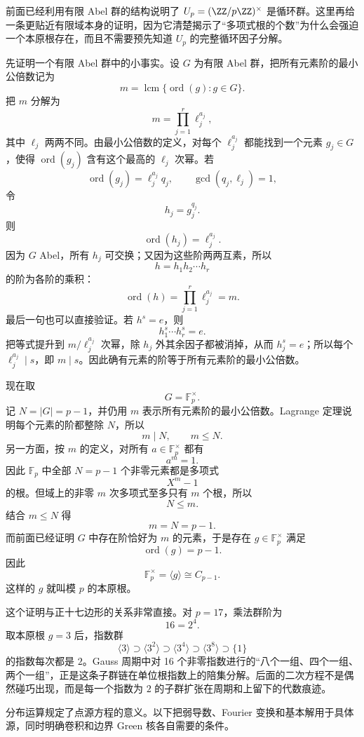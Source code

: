 前面已经利用有限 Abel 群的结构说明了 $U_p=(\ZZ/p\ZZ)^\times$ 是循环群。这里再给一条更贴近有限域本身的证明，因为它清楚揭示了``多项式根的个数''为什么会强迫一个本原根存在，而且不需要预先知道 $U_p$ 的完整循环因子分解。

先证明一个有限 Abel 群中的小事实。设 $G$ 为有限 Abel 群，把所有元素阶的最小公倍数记为
\[
m=\operatorname{lcm}\{\operatorname{ord}(g):g\in G\}.
\]
把 $m$ 分解为
\[
m=\prod_{j=1}^r \ell_j^{a_j},
\]
其中 $\ell_j$ 两两不同。由最小公倍数的定义，对每个 $\ell_j^{a_j}$ 都能找到一个元素 $g_j\in G$，使得 $\operatorname{ord}(g_j)$ 含有这个最高的 $\ell_j$ 次幂。若
\[
\operatorname{ord}(g_j)=\ell_j^{a_j}q_j,
\qquad \gcd(q_j,\ell_j)=1,
\]
令
\[
h_j=g_j^{q_j}.
\]
则
\[
\operatorname{ord}(h_j)=\ell_j^{a_j}.
\]
因为 $G$ Abel，所有 $h_j$ 可交换；又因为这些阶两两互素，所以
\[
h=h_1h_2\cdots h_r
\]
的阶为各阶的乘积：
\[
\operatorname{ord}(h)=
\prod_{j=1}^r\ell_j^{a_j}=m.
\]
最后一句也可以直接验证。若 $h^s=e$，则
\[
h_1^s\cdots h_r^s=e.
\]
把等式提升到 $m/\ell_j^{a_j}$ 次幂，除 $h_j$ 外其余因子都被消掉，从而 $h_j^s=e$；所以每个 $\ell_j^{a_j}\mid s$，即 $m\mid s$。因此确有元素的阶等于所有元素阶的最小公倍数。

现在取
\[
G=\mathbb F_p^\times.
\]
记 $N=|G|=p-1$，并仍用 $m$ 表示所有元素阶的最小公倍数。Lagrange 定理说明每个元素的阶都整除 $N$，所以
\[
m\mid N,
\qquad m\le N.
\]
另一方面，按 $m$ 的定义，对所有 $a\in\mathbb F_p^\times$ 都有
\[
a^m=1.
\]
因此 $\mathbb F_p$ 中全部 $N=p-1$ 个非零元素都是多项式
\[
X^m-1
\]
的根。但域上的非零 $m$ 次多项式至多只有 $m$ 个根，所以
\[
N\le m.
\]
结合 $m\le N$ 得
\[
m=N=p-1.
\]
而前面已经证明 $G$ 中存在阶恰好为 $m$ 的元素，于是存在 $g\in\mathbb F_p^\times$ 满足
\[
\operatorname{ord}(g)=p-1.
\]
因此
\begin{equation*}{
\mathbb F_p^\times=\langle g\rangle\cong C_{p-1}
}.\end{equation*}
这样的 $g$ 就叫模 $p$ 的本原根。

这个证明与正十七边形的关系非常直接。对 $p=17$，乘法群阶为
\[
16=2^4.
\]
取本原根 $g=3$ 后，指数群
\[
\langle3\rangle
\supset
\langle3^2\rangle
\supset
\langle3^4\rangle
\supset
\langle3^8\rangle
\supset
\{1\}
\]
的指数每次都是 $2$。Gauss 周期中对 16 个非零指数进行的``八个一组、四个一组、两个一组''，正是这条子群链在单位根指数上的陪集分解。后面的二次方程不是偶然碰巧出现，而是每一个指数为 $2$ 的子群扩张在周期和上留下的代数痕迹。


分布运算规定了点源方程的意义。以下把弱导数、Fourier 变换和基本解用于具体源，同时明确卷积和边界 Green 核各自需要的条件。






